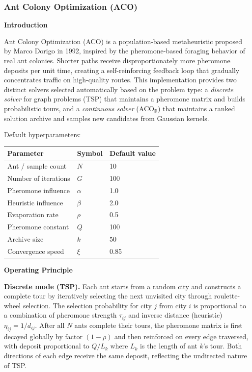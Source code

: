 \subsubsection{Ant Colony Optimization (ACO)}

\textbf{Introduction}

Ant Colony Optimization (ACO) is a population-based metaheuristic proposed by Marco Dorigo in
1992, inspired by the pheromone-based foraging behavior of real ant colonies. Shorter paths
receive disproportionately more pheromone deposits per unit time, creating a self-reinforcing
feedback loop that gradually concentrates traffic on high-quality routes. This implementation
provides two distinct solvers selected automatically based on the problem type: a
\textit{discrete solver} for graph problems (TSP) that maintains a pheromone matrix and builds
probabilistic tours, and a \textit{continuous solver} (ACO$_\mathbb{R}$) that maintains a
ranked solution archive and samples new candidates from Gaussian kernels.

Default hyperparameters:
\begin{center}
\begin{tabular}{lll}
\hline
\textbf{Parameter} & \textbf{Symbol} & \textbf{Default value} \\
\hline
Ant / sample count      & $N$            & 10   \\
Number of iterations    & $G$            & 100  \\
Pheromone influence     & $\alpha$       & 1.0  \\
Heuristic influence     & $\beta$        & 2.0  \\
Evaporation rate        & $\rho$         & 0.5  \\
Pheromone constant      & $Q$            & 100  \\
Archive size            & $k$            & 50   \\
Convergence speed       & $\xi$          & 0.85 \\
\hline
\end{tabular}
\end{center}

\textbf{Operating Principle}

\textbf{Discrete mode (TSP).}
Each ant starts from a random city and constructs a complete tour by iteratively selecting the
next unvisited city through roulette-wheel selection. The selection probability for city $j$
from city $i$ is proportional to a combination of pheromone strength $\tau_{ij}$ and inverse
distance (heuristic) $\eta_{ij}=1/d_{ij}$. After all $N$ ants complete their tours, the
pheromone matrix is first decayed globally by factor $(1-\rho)$ and then reinforced on every
edge traversed, with deposit proportional to $Q/L_k$ where $L_k$ is the length of ant $k$'s
tour. Both directions of each edge receive the same deposit, reflecting the undirected nature
of TSP.

